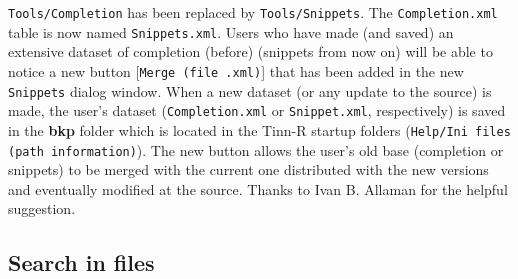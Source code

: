 \texttt{Tools/Completion} has been replaced by \texttt{Tools/Snippets}. The \texttt{Completion.xml}
table is now named \texttt{Snippets.xml}. Users who have made (and saved) an extensive dataset of completion
(before) (snippets from now on) will be able to notice a new button [\texttt{Merge (file .xml)}] that has been added
in the new \texttt{Snippets} dialog window. When a new dataset (or any update to the source) is made,
the user's dataset (\texttt{Completion.xml} or \texttt{Snippet.xml}, respectively) is saved in the \textbf{bkp} folder which is located
in the Tinn-R startup folders (\texttt{Help/Ini files (path information)}). The new button allows the user's old base
(completion or snippets) to be merged with the current one distributed with the new versions and eventually
modified at the source. Thanks to Ivan B. Allaman for the helpful suggestion.


\hypertarget{searchinfiles}{}
\subsection{Search in files}

